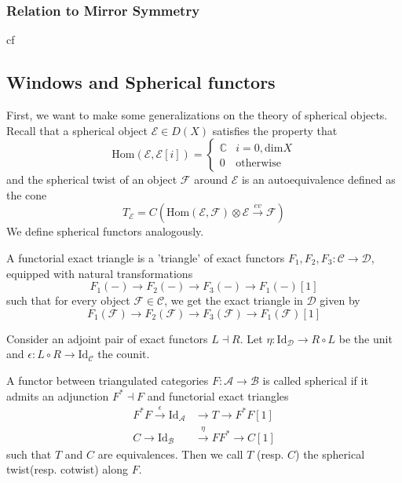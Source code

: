 \subsubsection{Relation to Mirror Symmetry}
cf


\subsection{Windows and Spherical functors}

First, we want to make some generalizations on the theory of spherical objects. Recall that a spherical object $\mathcal{E} \in D(X)$ satisfies the property that $$\mathrm{Hom}(\mathcal{E}, \mathcal{E}[i])= \begin{cases}
\mathbb{C} & i=0,\mathrm{dim}X  \\
0 & \text{otherwise}
\end{cases}$$
and the spherical twist of an object $\mathcal{F}$ around $\mathcal{E}$ is an autoequivalence defined as the cone $$T_\mathcal{E} = C(\mathrm{Hom}(\mathcal{E},\mathcal{F})\otimes \mathcal{E}\xrightarrow{ev} \mathcal{F})$$
We define spherical functors analogously.



\begin{definition}{}{}
	A functorial exact triangle is a 'triangle' of exact functors $F_{1}, F_{2}, F_{3} : \mathcal{C}\to \mathcal{D}$,    equipped with natural transformations $$
F_{1}(-)\to F_{2}(-)\to F_{3}(-)\to F_{1}(-)[1]
$$ such that for every object $\mathcal{F}\in \mathcal{C}$,   we get the exact triangle in $\mathcal{D}$ given by $$
F_{1}(\mathcal{F})\to F_{2}(\mathcal{F})\to F_{3}(\mathcal{F})\to F_{1}(\mathcal{F})[1]
$$
\end{definition}

Consider an adjoint pair of exact functors $L \dashv R$. Let $\eta : \mathrm{Id}_\mathcal{D}\to R\circ L$ be the unit and $\epsilon : L\circ R \to \mathrm{Id}_\mathcal{C}$ the counit. 

\begin{definition}{}{}
A functor between triangulated categories $F: \mathcal{A}\to \mathcal{B}$ is called spherical if it admits an adjunction $F^{*}\dashv F$ and  functorial exact triangles 
\begin{align}
F^{*}F \xrightarrow{\epsilon} \mathrm{Id}_\mathcal{A}&\to T \to F^{*}F [1] \\
C\to \mathrm{Id}_\mathcal{B}&\xrightarrow{\eta} F F^{*}\to C[1]
\end{align} such that $T$ and $C$ are equivalences. Then we call $T$ (resp. $C$) the spherical twist(resp. cotwist) along $F$. 
\end{definition}


